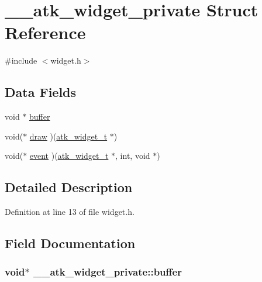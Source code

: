 \hypertarget{struct____atk__widget__private}{\section{\+\_\+\+\_\+atk\+\_\+widget\+\_\+private Struct Reference}
\label{struct____atk__widget__private}
}


{\ttfamily \#include $<$widget.\+h$>$}

\subsection*{Data Fields}
\begin{DoxyCompactItemize}
\item 
void $\ast$ \hyperlink{struct____atk__widget__private_ad4c3a44969eed941222e6070a9618fd8}{buffer}
\item 
void($\ast$ \hyperlink{struct____atk__widget__private_ae3e2eae5b840dd43fd3f458d077a8fe9}{draw} )(\hyperlink{widget_8h_a544e7cd50238d158c5a155ae3f3c1748}{atk\+\_\+widget\+\_\+t} $\ast$)
\item 
void($\ast$ \hyperlink{struct____atk__widget__private_a46674987ae41a9d4e1b33b9e2d9424bc}{event} )(\hyperlink{widget_8h_a544e7cd50238d158c5a155ae3f3c1748}{atk\+\_\+widget\+\_\+t} $\ast$, int, void $\ast$)
\end{DoxyCompactItemize}


\subsection{Detailed Description}


Definition at line 13 of file widget.\+h.



\subsection{Field Documentation}
\hypertarget{struct____atk__widget__private_ad4c3a44969eed941222e6070a9618fd8}{
\subsubsection[{buffer}]{\setlength{\rightskip}{0pt plus 5cm}void$\ast$ \+\_\+\+\_\+atk\+\_\+widget\+\_\+private\+::buffer}}\label{struct____atk__widget__private_ad4c3a44969eed941222e6070a9618fd8}


